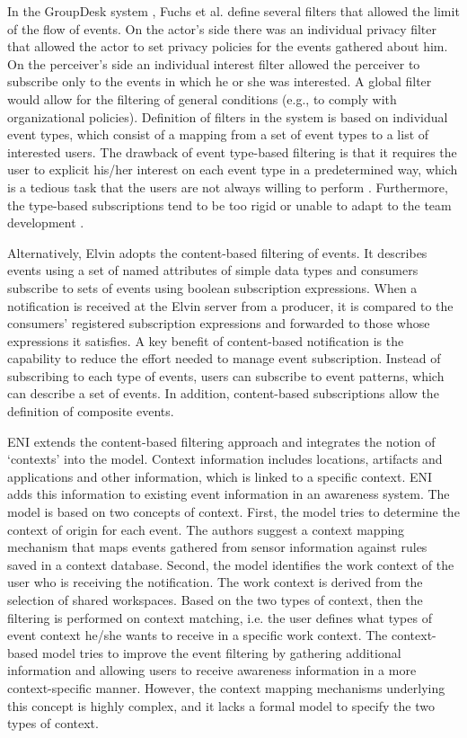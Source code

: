 
In the GroupDesk system \cite{Fuchs1995}, Fuchs et al. define several filters that allowed the limit of the flow of events. On the actor’s side there was an individual privacy filter that allowed the actor to set privacy policies for the events gathered about him. On the perceiver’s side an individual interest filter allowed the perceiver to subscribe only to the events in which he or she was interested. A global filter would allow for the filtering of general conditions (e.g., to comply with organizational policies). Definition of filters in the system is based on individual event types, which consist of a mapping from a set of event types to a list of interested users. The drawback of event type-based filtering is that it requires the user to explicit his/her interest on each event type in a predetermined way, which is a tedious task that the users are not always willing to perform \cite{Grudin1994}. Furthermore, the type-based subscriptions tend to be too rigid or unable to adapt to the team development \cite{Alarcon2002}.

Alternatively, Elvin \cite{Fitzpatrick2002} adopts the content-based filtering of events. It describes events using a set of named attributes of simple data types and consumers subscribe to sets of events using boolean subscription expressions. When a notification is received at the Elvin server from a producer, it is compared to the consumers’ registered subscription expressions and forwarded to those whose expressions it satisfies. A key benefit of content-based notification is the capability to reduce the effort needed to manage event subscription. Instead of subscribing to each type of events, users can subscribe to event patterns, which can describe a set of events. In addition, content-based subscriptions allow the definition of composite events.

ENI \cite{Gross2004} extends the content-based filtering approach and integrates the notion of `contexts' into the model. Context information includes locations, artifacts and applications and other information, which is linked to a specific context. ENI adds this information to existing event information in an awareness system. The model is based on two concepts of context. First, the model tries to determine the context of origin for each event. The authors suggest a context mapping mechanism that maps events gathered from sensor information against rules saved in a context database. Second, the model identifies the work context of the user who is receiving the notification. The work context is derived from the selection of shared workspaces. Based on the two types of context, then the filtering is performed on context matching, i.e. the user defines what types of event context he/she wants to receive in a specific work context. The context-based model tries to improve the event filtering by gathering additional information and allowing users to receive awareness information in a more context-specific manner. However, the context mapping mechanisms underlying this concept is highly complex, and it lacks a formal model to specify the two types of context.

